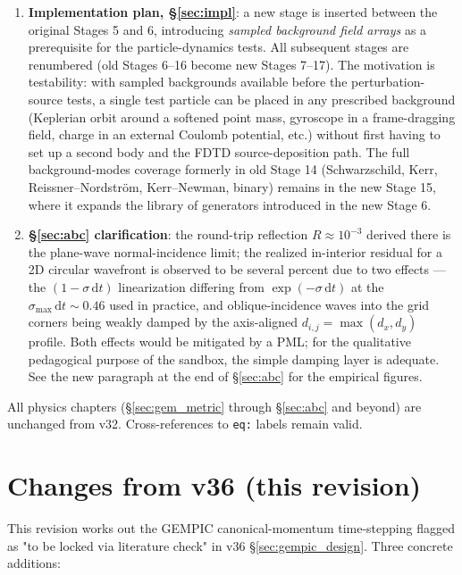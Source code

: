 \documentclass[11pt,a4paper]{article}
\newcommand{\dd}{\mathrm{d}}
\begin{document}
\begin{enumerate}
  \item \textbf{Implementation plan, §\ref{sec:impl}}: a new stage is inserted between the original Stages 5 and 6, introducing \emph{sampled background field arrays} as a prerequisite for the particle-dynamics tests.  All subsequent stages are renumbered (old Stages 6--16 become new Stages 7--17).  The motivation is testability: with sampled backgrounds available before the perturbation-source tests, a single test particle can be placed in any prescribed background (Keplerian orbit around a softened point mass, gyroscope in a frame-dragging field, charge in an external Coulomb potential, etc.) without first having to set up a second body and the FDTD source-deposition path.  The full background-modes coverage formerly in old Stage 14 (Schwarzschild, Kerr, Reissner--Nordstr\"om, Kerr--Newman, binary) remains in the new Stage 15, where it expands the library of generators introduced in the new Stage 6.
  \item \textbf{§\ref{sec:abc} clarification}: the round-trip reflection $R\approx10^{-3}$ derived there is the plane-wave normal-incidence limit; the realized in-interior residual for a 2D circular wavefront is observed to be several percent due to two effects --- the $(1-\sigma\,\dd t)$ linearization differing from $\exp(-\sigma\,\dd t)$ at the $\sigma_{\max}\,\dd t\sim0.46$ used in practice, and oblique-incidence waves into the grid corners being weakly damped by the axis-aligned $d_{i,j}=\max(d_x,d_y)$ profile.  Both effects would be mitigated by a PML; for the qualitative pedagogical purpose of the sandbox, the simple damping layer is adequate.  See the new paragraph at the end of §\ref{sec:abc} for the empirical figures.
\end{enumerate}

All physics chapters (§\ref{sec:gem_metric} through §\ref{sec:abc} and beyond) are unchanged from v32.  Cross-references to \texttt{eq:} labels remain valid.

\newpage

\section*{Changes from v36 (this revision)}

This revision works out the GEMPIC canonical-momentum time-stepping
flagged as "to be locked via literature check" in v36
§\ref{sec:gempic_design}.  Three concrete additions:
\end{document}
